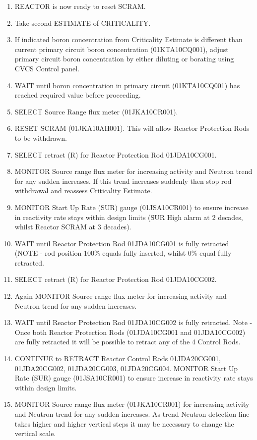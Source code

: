 \documentclass[10pt,a4paper]{article}
\begin{document}
\begin{enumerate}
\item REACTOR is now ready to reset SCRAM.
\item Take second ESTIMATE of CRITICALITY.
\item If indicated boron concentration from Criticality Estimate is different than current primary circuit boron concentration (01KTA10CQ001), adjust primary circuit boron concentration by either diluting or borating using CVCS Control panel.
\item WAIT until boron concentration in primary circuit (01KTA10CQ001) has reached required value before proceeding.
\item SELECT Source Range flux meter (01JKA10CR001).
\item RESET SCRAM (01JKA10AH001). This will allow Reactor Protection Rods to be withdrawn.
\item SELECT retract (R) for Reactor Protection Rod 01JDA10CG001.
\item MONITOR Source range flux meter for increasing activity and Neutron trend for any sudden increases. If this trend increases suddenly then stop rod withdrawal and reassess Criticality Estimate.
\item MONITOR Start Up Rate (SUR) gauge (01JSA10CR001) to ensure increase in reactivity rate stays within design limits (SUR High alarm at 2 decades, whilst Reactor SCRAM at 3 decades).
\item WAIT until Reactor Protection Rod  01JDA10CG001 is fully retracted (NOTE - rod position 100\% equals fully inserted, whilst 0\% equal fully retracted.
\item SELECT retract (R) for Reactor Protection Rod 01JDA10CG002.
\item Again MONITOR Source range flux meter for increasing activity and Neutron trend for any sudden increases.
\item WAIT until Reactor Protection Rod  01JDA10CG002 is fully retracted. Note - Once both Reactor Protection Rods (01JDA10CG001 and 01JDA10CG002) are fully retracted it will be possible to retract any of the 4 Control Rods.
\item CONTINUE to RETRACT Reactor Control Rods 01JDA20CG001, 01JDA20CG002, 01JDA20CG003, 01JDA20CG004. MONITOR Start Up Rate (SUR) gauge (01JSA10CR001) to ensure increase in reactivity rate stays within design limits.
\item MONITOR Source range flux meter (01JKA10CR001) for increasing activity and Neutron trend for any sudden increases. As trend Neutron detection line takes higher and higher vertical steps it may be necessary to change the vertical scale.

\end{enumerate}
\end{document}
